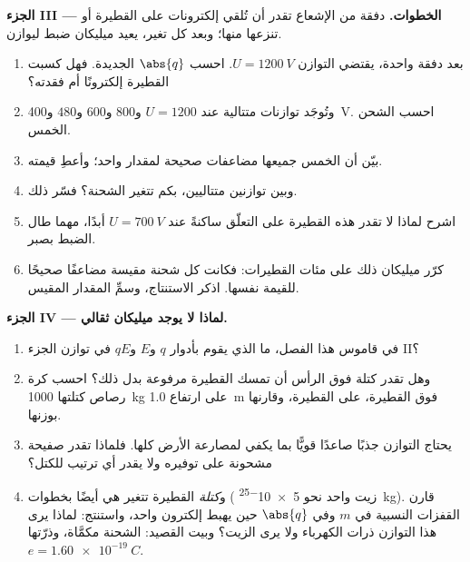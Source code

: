 \begin{problem}
\medskip
\noindent\textbf{الجزء III --- الخطوات.}
دفقة من الإشعاع تقدر أن تُلقي إلكترونات على القطيرة أو تنزعها منها؛ وبعد
كل تغير، يعيد ميليكان ضبط  ليوازن.
\begin{enumerate}[resume]
  \item بعد دفقة واحدة، يقتضي التوازن $U = \qty{1200}{V}$. احسب
        $\abs{q}$ الجديدة. فهل كسبت القطيرة إلكترونًا أم فقدته؟
  \item وتُوجَد توازنات متتالية عند $U = 1200$ و$800$ و$600$
        و$480$ و\qty{400}{V}. احسب الشحن الخمس.
  \item بيّن أن الخمس جميعها مضاعفات صحيحة لمقدار واحد؛ وأعطِ
        قيمته.
  \item وبين توازنين متتاليين، بكم تتغير الشحنة؟
        فسّر ذلك.
  \item اشرح لماذا لا تقدر هذه القطيرة على التعلّق ساكنةً عند
        $U = \qty{700}{V}$ أبدًا، مهما طال الضبط بصبر.
  \item كرّر ميليكان ذلك على مئات القطيرات: فكانت كل شحنة مقيسة
        مضاعفًا صحيحًا للقيمة نفسها. اذكر
        الاستنتاج، وسمِّ المقدار المقيس.
\end{enumerate}

\medskip
\noindent\textbf{الجزء IV --- لماذا لا يوجد ميليكان ثقالي.}
\begin{enumerate}[resume]
  \item في قاموس هذا الفصل، ما الذي يقوم بأدوار $q$ و$E$
        و$qE$ في توازن الجزء II؟
  \item وهل تقدر كتلة فوق الرأس أن تمسك القطيرة مرفوعة بدل ذلك؟ احسب
         كرة رصاص كتلتها \qty{1000}{kg} على ارتفاع \qty{1.0}{m} فوق
        القطيرة،  على القطيرة، وقارنها بوزنها.
  \item يحتاج التوازن جذبًا صاعدًا قويًّا بما يكفي لمصارعة
        الأرض كلها. فلماذا تقدر صفيحة مشحونة على توفيره ولا يقدر
        أي ترتيب للكتل؟
  \item و\emph{كتلة} القطيرة تتغير هي أيضًا بخطوات ( زيت
        واحد نحو \qty{5e-25}{kg}). قارن القفزات النسبية في
        $m$ وفي $\abs{q}$ حين يهبط إلكترون واحد، واستنتج: لماذا
        يرى هذا التوازن ذرات الكهرباء ولا يرى  الزيت؟ وبيت القصيد:
        الشحنة مكمَّاة، وذرّتها $e = \qty{1.60e-19}{C}$.
\end{enumerate}
\end{problem}
